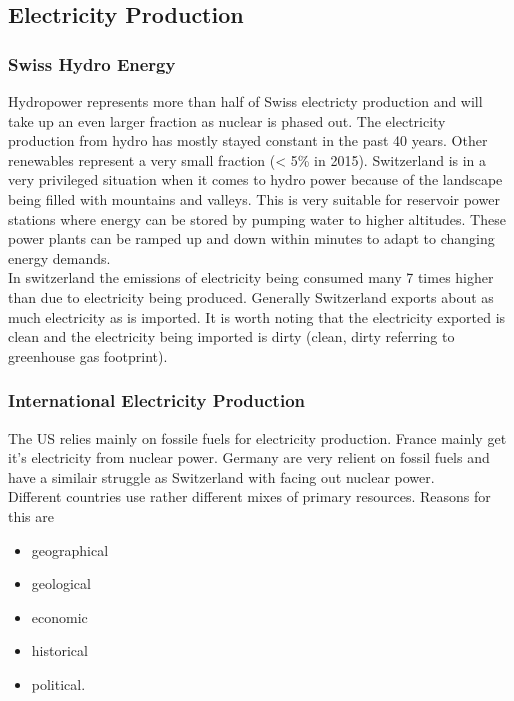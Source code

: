 \subsection{Electricity Production}

\subsubsection{Swiss Hydro Energy}
Hydropower represents more than half of Swiss electricty production and will take up an even larger fraction as nuclear is phased out.
The electricity production from hydro has mostly stayed constant in the past 40 years.
Other renewables represent a very small fraction (< 5\% in 2015).
Switzerland is in a very privileged situation when it comes to hydro power because of the landscape being filled with mountains and valleys.
This is very suitable for reservoir power stations where energy can be stored by pumping water to higher altitudes.
These power plants can be ramped up and down within minutes to adapt to changing energy demands.\\

In switzerland the \cotwo emissions of electricity being consumed many 7 times higher than due to electricity being produced.
Generally Switzerland exports about as much electricity as is imported. It is worth noting that the electricity exported is clean and the electricity being imported is dirty (clean, dirty referring to greenhouse gas footprint).

\subsubsection{International Electricity Production}
The US relies mainly on fossile fuels for electricity production.
France mainly get it's electricity from nuclear power.
Germany are very relient on fossil fuels and have a similair struggle as Switzerland with facing out nuclear power.\\

Different countries use rather different mixes of primary resources.
Reasons for this are

\begin{itemize}
    \item geographical
    \item geological
    \item economic
    \item historical
    \item political.
\end{itemize}

